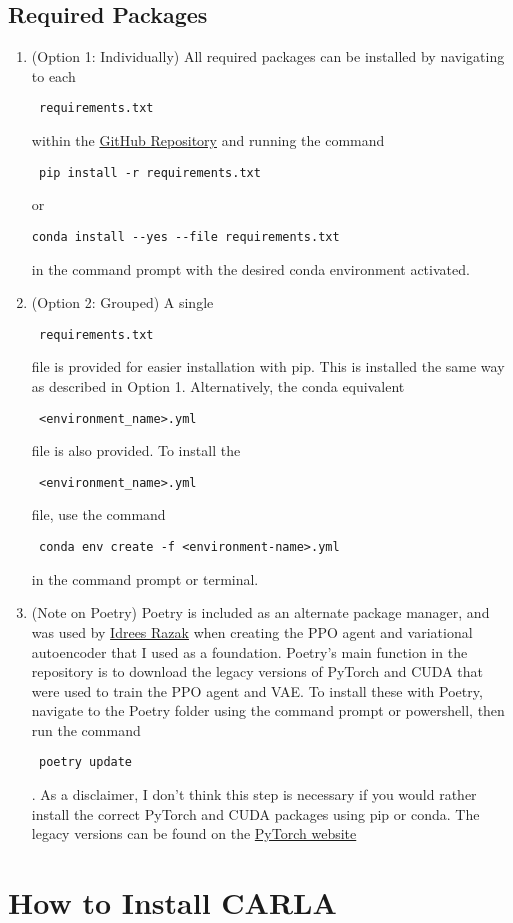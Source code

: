 \documentclass{article}
\begin{document}
\subsection{Required Packages}
\begin{enumerate}
\item(Option 1: Individually) All required packages can be installed by navigating to each \begin{verbatim} requirements.txt \end{verbatim} within the \href{https://github.com/hrwhite21/RL_CARLA_ADAS}{GitHub Repository} and running the command \begin{verbatim} pip install -r requirements.txt \end{verbatim} or \begin{verbatim}conda install --yes --file requirements.txt \end{verbatim} in the command prompt with the desired conda environment activated.
\item(Option 2: Grouped) A single \begin{verbatim} requirements.txt \end{verbatim} file is provided for easier installation with pip. This is installed the same way as described in Option 1. Alternatively, the conda equivalent \begin{verbatim} <environment_name>.yml \end{verbatim} file is also provided. To install the \begin{verbatim} <environment_name>.yml \end{verbatim} file, use the command \begin{verbatim} conda env create -f <environment-name>.yml \end{verbatim} in the command prompt or terminal.
\item(Note on Poetry) Poetry is included as an alternate package manager, and was used by \href{https://github.com/idreesshaikh}{Idrees Razak} when creating the PPO agent and variational autoencoder that I used as a foundation. Poetry's main function in the repository is to download the legacy versions of PyTorch and CUDA that were used to train the PPO agent and VAE. To install these with Poetry, navigate to the Poetry folder using the command prompt or powershell, then run the command \begin{verbatim} poetry update\end{verbatim}. As a disclaimer, I don't think this step is necessary if you would rather install the correct PyTorch and CUDA packages using pip or conda. The legacy versions can be found on the \href{}{PyTorch website}
\end{enumerate}



\section{How to Install CARLA}
\label{sec:CARLAInstall}
\end{document}
